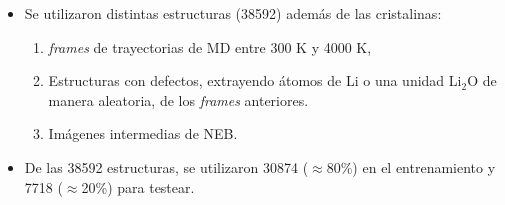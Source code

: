 \documentclass[aspectratio=169]{beamer}
\begin{document}
\begin{frame}
\begin{columns}
\begin{itemize}
                \pause

                \item Se utilizaron distintas estructuras (38592) además de las 
                    cristalinas:
                    \begin{enumerate}
                        \item \textit{frames} de trayectorias de MD entre 300 K
                            y 4000 K,
                        \item Estructuras con defectos, extrayendo átomos de Li o
                            una unidad Li$_2$O de manera aleatoria, de los 
                            \textit{frames} anteriores.
                        \item Imágenes intermedias de NEB.
                    \end{enumerate}
                \item De las 38592 estructuras, se utilizaron 30874 
                    ($\approx$80\%) en el entrenamiento y 7718 ($\approx$20\%) 
                    para testear.
            \end{itemize}
        \end{columns}

    \end{frame}
    
\end{document}
